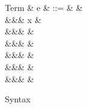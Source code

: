 \begin{figure}[H]
\begin{syntaxfig}
\mbox{Term}
&
e
&
::=
&
\hole
&
\\
&&&
x
&
\\
&&&
&
\\
&&&
\exNil
&
\\
&&&
&
\\
&&&
\exLambda{\sigma}
&
\\
&&&
&
\end{syntaxfig}
\caption{Syntax}
\end{figure}
